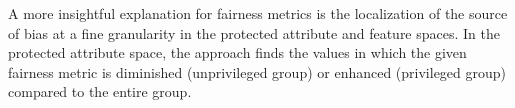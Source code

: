 \documentclass{article}
\begin{document}
A more insightful explanation for fairness metrics is the localization of the source of bias at a fine granularity in the protected attribute and feature spaces.  In the protected attribute space, the approach finds the values in which the given fairness metric is diminished (unprivileged group) or enhanced (privileged group) compared to the entire group. 
%
%
%
\end{document}
